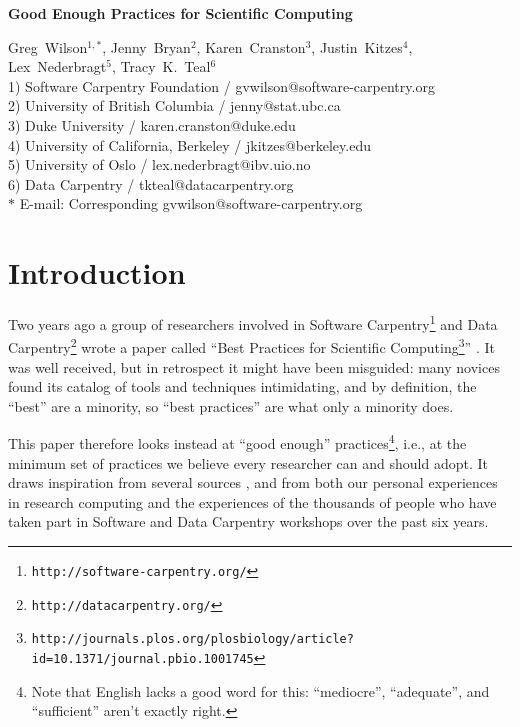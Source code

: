 \documentclass[10pt]{article}
\date{}
\newcommand{\withurl}[2]{{#1}\footnote{\texttt{#2}}}
\begin{document}
\begin{flushleft}
{\Large
\textbf{Good Enough Practices for Scientific Computing}
}

{Greg~Wilson}$^{1,\ast}$,
{Jenny~Bryan}$^{2}$,
{Karen~Cranston}$^{3}$,
{Justin~Kitzes}$^{4}$,
{Lex~Nederbragt}$^{5}$,
{Tracy~K.~Teal}$^{6}$
\\
1) Software Carpentry Foundation / gvwilson@software-carpentry.org
\\
2) University of British Columbia / jenny@stat.ubc.ca
\\
3) Duke University / karen.cranston@duke.edu
\\
4) University of California, Berkeley / jkitzes@berkeley.edu
\\
5) University of Oslo / lex.nederbragt@ibv.uio.no
\\
6) Data Carpentry / tkteal@datacarpentry.org
\\
$\ast$ E-mail: Corresponding gvwilson@software-carpentry.org
\end{flushleft}

\section{Introduction}\label{introduction}

Two years ago a group of researchers involved in \withurl{Software
  Carpentry}{http://software-carpentry.org/} and \withurl{Data
  Carpentry}{http://datacarpentry.org/} wrote a paper called
``\withurl{Best Practices for Scientific
  Computing}{http://journals.plos.org/plosbiology/article?id=10.1371/journal.pbio.1001745}''
\cite{wilson2014}. It was well received, but in retrospect it might
have been misguided: many novices found its catalog of tools and
techniques intimidating, and by definition, the ``best'' are a
minority, so ``best practices'' are what only a minority does.

This paper therefore looks instead at ``good enough''
practices\footnote{Note that English lacks a good word for this:
  ``mediocre'', ``adequate'', and ``sufficient'' aren't exactly
  right.}, i.e., at the minimum set of practices we believe every
researcher can and should adopt. It draws inspiration from several
sources \cite{gentzkow2014,noble2009,brown2015,wickham2014,kitzes2016,sandve2013,hart2015},
and from both our personal experiences in research computing
and the experiences of the thousands of people who have taken part
in Software and Data Carpentry workshops over the past six years.
\end{document}
